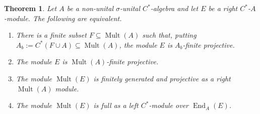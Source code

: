 \documentclass[10pt,a4paper]{amsart}
\numberwithin{equation}{section}
\newtheorem{thm}{Theorem}[section]
\DeclareMathOperator{\End}{End} %
\DeclareMathOperator{\Mult}{Mult} %
\begin{document}
\begin{thm} \label{thm:equiv-one}
Let $A$ be a non-unital $\sigma$-unital $C^*$-algebra and let $E$ be a right $C^*$-$A$-module. The following are equivalent.
\begin{enumerate}\itemsep=0pt
\item[$1.$] %
There is a finite subset $F \subseteq \Mult(A)$ such that, putting
 $A_b := C^*(F \cup A) \subseteq \Mult(A)$, the module $E$ is $A_b$-finite
 projective.
\item[$2.$] %
The module $E$ is $\Mult(A)$-finite projective.
\item[$3.$] %
The module $\Mult(E)$ is finitely generated and projective as a right $\Mult(A)$ module.
\item[$4.$] %
The module $\Mult(E)$ is full as a left $C^*$-module over $\End_A(E)$.
\end{enumerate}
\end{thm}
\end{document}
